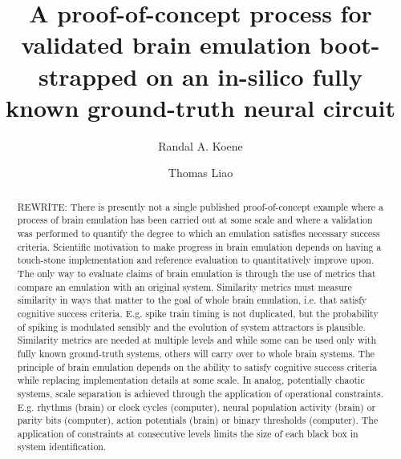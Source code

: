\documentclass{ldr-article}
\title{A proof-of-concept process for validated brain emulation boot-strapped on an in-silico fully known ground-truth neural circuit}
\author[1]{Randal A. Koene}
\author[1]{Thomas Liao}
\affil[1]{Carboncopies Foundation for Brain Research}
\begin{document}
    \maketitle

    \begin{abstract}
       \alert{REWRITE}: 
       There is presently not a single published proof-of-concept example where a process of brain emulation has been carried out at some scale and where a validation was performed to quantify the degree to which an emulation satisfies necessary success criteria. Scientific motivation to make progress in brain emulation depends on having a touch-stone implementation and reference evaluation to quantitatively improve upon. The only way to evaluate claims of brain emulation is through the use of metrics that compare an emulation with an original system. Similarity metrics must measure similarity in ways that matter to the goal of whole brain emulation, i.e. that satisfy cognitive success criteria. E.g. spike train timing is not duplicated, but the probability of spiking is modulated sensibly and the evolution of system attractors is plausible. Similarity metrics are needed at multiple levels and while some can be used only with fully known ground-truth systems, others will carry over to whole brain systems. The principle of brain emulation depends on the ability to satisfy cognitive success criteria while replacing implementation details at some scale. In analog, potentially chaotic systems, scale separation is achieved through the application of operational constraints. E.g. rhythms (brain) or clock cycles (computer), neural population activity (brain) or parity bits (computer), action potentials (brain) or binary thresholds (computer). The application of constraints at consecutive levels limits the size of each black box in system identification.
    \end{abstract}
    
\end{document}
